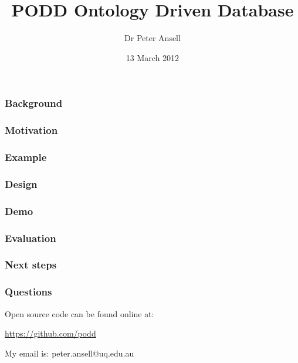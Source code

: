 \documentclass[12pt]{beamer}
\title{PODD Ontology Driven Database}
\author{Dr Peter Ansell}
\institute{University of Queensland}
\date{13 March 2012}
\begin{document}
\begin{frame}
\titlepage
\end{frame}


\begin{frame}
\frametitle{Background} 

\end{frame}

\begin{frame}
\frametitle{Motivation} 

\end{frame}

\begin{frame}
\frametitle{Example} 

\end{frame}

\begin{frame}
\frametitle{Design} 

\end{frame}

\bgroup
\begin{frame}[plain]{}

\end{frame}
\egroup

\begin{frame}
\frametitle{Demo} 

\end{frame}

\begin{frame}
\frametitle{Evaluation}

\end{frame}

\begin{frame}
\frametitle{Next steps}

\end{frame}


\begin{frame}
\frametitle{Questions}

Open source code can be found online at:

\url{https://github.com/podd}

My email is: peter.ansell@uq.edu.au

\end{frame}
\end{document}
